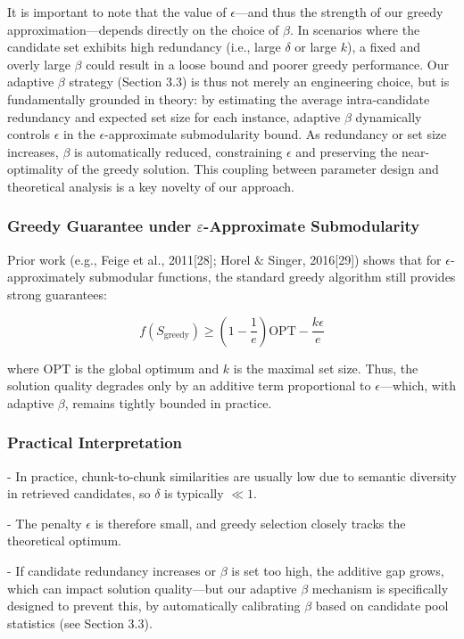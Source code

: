 \documentclass[11pt]{article}
\begin{document}
It is important to note that the value of $\epsilon$—and thus the strength of our greedy approximation—depends directly on the choice of $\beta$. In scenarios where the candidate set exhibits high redundancy (i.e., large $\delta$ or large $k$), a fixed and overly large $\beta$ could result in a loose bound and poorer greedy performance.  
Our adaptive $\beta$ strategy (Section 3.3) is thus not merely an engineering choice, but is fundamentally grounded in theory: by estimating the average intra-candidate redundancy and expected set size for each instance, adaptive $\beta$ dynamically controls $\epsilon$ in the $\epsilon$-approximate submodularity bound. As redundancy or set size increases, $\beta$ is automatically reduced, constraining $\epsilon$ and preserving the near-optimality of the greedy solution.  
This coupling between parameter design and theoretical analysis is a key novelty of our approach.

\subsubsection{Greedy Guarantee under $\varepsilon$-Approximate Submodularity}

Prior work (e.g., Feige et al., 2011[28]; Horel $\&$ Singer, 2016[29]) shows that for $\epsilon$-approximately submodular functions, the standard greedy algorithm still provides strong guarantees:

\begin{equation}
  \label{eq:example}
  f(S_{\text{greedy}}) \geq \left(1 - \frac{1}{e}\right) \mathrm{OPT} - \frac{k \epsilon}{e}
\end{equation}

where $\mathrm{OPT}$ is the global optimum and $k$ is the maximal set size. Thus, the solution quality degrades only by an additive term proportional to $\epsilon$—which, with adaptive $\beta$, remains tightly bounded in practice.

\subsubsection{Practical Interpretation}

- In practice, chunk-to-chunk similarities are usually low due to semantic diversity in retrieved candidates, so $\delta$ is typically $\ll 1$.
    
- The penalty $\epsilon$ is therefore small, and greedy selection closely tracks the theoretical optimum.
    
- If candidate redundancy increases or $\beta$ is set too high, the additive gap grows, which can impact solution quality—but our adaptive $\beta$ mechanism is specifically designed to prevent this, by automatically calibrating $\beta$ based on candidate pool statistics (see Section 3.3).
\end{document}
